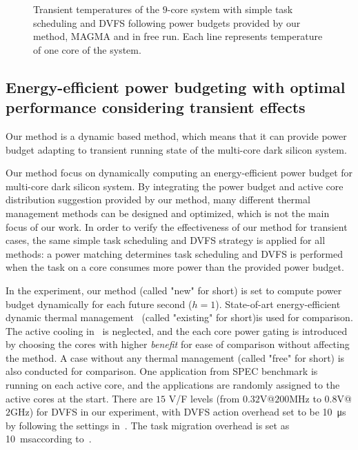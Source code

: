 \begin{figure}[htb]
{  }
  \caption{Transient temperatures of the $9$-core system with simple task scheduling and DVFS following power budgets provided by our method, MAGMA and in free run. Each line represents temperature of one core of the system.}
  \label{fig:transient_ppw_temperature}
\end{figure}

\subsection{Energy-efficient power budgeting with optimal performance considering transient effects}
Our method is a dynamic based method, which means that it can provide power budget adapting to transient running state of the multi-core dark silicon system.

Our method focus on dynamically computing an energy-efficient power budget for multi-core dark silicon system. By integrating the power budget and active core distribution suggestion provided by our method, many different thermal management methods can be designed and optimized, which is not the main focus of our work. In order to verify the effectiveness of our method for transient cases, the same simple task scheduling and DVFS strategy is applied for all methods: a power matching determines task scheduling and DVFS is performed when the task on a core consumes more power than the provided power budget.

In the experiment, our method (called "new" for short) is set to compute power budget dynamically for each future second ($h=1$). State-of-art energy-efficient dynamic thermal management~\cite{Hanumaiah:TCOMP'14} (called "existing" for short)is used for comparison. The active cooling in~\cite{Hanumaiah:TCOMP'14} is neglected, and the each core power gating is introduced by choosing the cores with higher \emph{benefit} for ease of comparison without affecting the method. A case without any thermal management (called "free" for short) is also conducted for comparison. One application from SPEC benchmark is running on each active core, and the applications are randomly assigned to the active cores at the start. There are $15$ V/F levels (from $0.32$V@$200$MHz to $0.8$V@$2$GHz) for DVFS in our experiment, with DVFS action overhead set to be \SI{10}{\us} by following the settings in~\cite{Lu:MICRO'05}. The task migration overhead is set as \SI{10}{\ms}according to~\cite{Cuesta:ISVLSI'10}.


